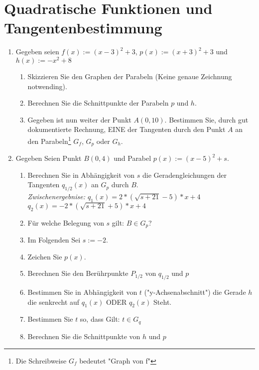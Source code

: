 \documentclass{scrartcl}
\begin{document}
	\section{Quadratische Funktionen und Tangentenbestimmung}
		
	\begin{enumerate}
		\item Gegeben seien $f(x) := (x-3)^2+3$, $p(x) := (x+3)^2+3$ und $h(x) := -x^2+8$
		\begin{enumerate}
			\item Skizzieren Sie den Graphen der Parabeln (Keine genaue Zeichnung notwending).
			\item Berechnen Sie die Schnittpunkte der Parabeln $p$ und $h$.
			\item Gegeben ist nun weiter der Punkt $A(0,10)$. Bestimmen Sie, durch gut dokumentierte Rechnung, EINE der Tangenten durch den Punkt $A$ an den Parabeln\footnote{Die Schreibweise $G_f$ bedeutet "Graph von f"} $G_f$, $G_p$ oder $G_h$. \\
		\end{enumerate} %
		
		
		\item Gegeben Seien Punkt $B(0,4)$ und Parabel $p(x):=(x-5)^2+s$.
		\begin{enumerate}
			\item Berechnen Sie in Abhängigkeit von $s$ die Geradengleichungen der Tangenten $q_{1/2}(x)$ an $G_p$ durch $B$. \\
				\emph{Zwischenergebnise: $q_1(x) = 2 * (\sqrt{s+21}-5 )*x+4$ \quad $q_2(x) = -2 * (\sqrt{s+21}+5 )*x+4$}
			\item Für welche Belegung von $s$ gilt: $B\in G_p $? 
			\item Im Folgenden Sei $s:=-2$.
			\item Zeichen Sie $p(x)$.

			\item Berechnen Sie den Berührpunkte $P_{1/2}$ von $q_{1/2}$ und $p$
			\item Bestimmen Sie in Abhängigkeit von $t$ ("y-Achsenabschnitt") die Gerade $h$ die senkrecht auf $q_1(x)$ ODER $q_2(x)$ Steht.
			\item Bestimmen Sie $t$ so, dass Gilt: $t \in G_q$
			\item Berechnen Sie die Schnittpunkte von $h$ und $p$ \\
		\end{enumerate} %
		
		
		
	\end{enumerate} 
	
	
\end{document}
